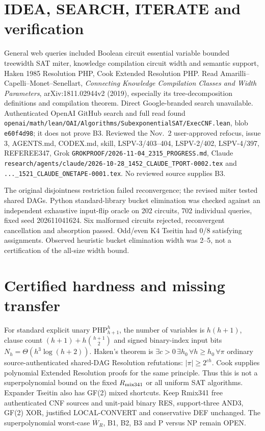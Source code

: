 \documentclass[11pt]{article}
\begin{document}
\section*{IDEA, SEARCH, ITERATE and verification}
General web queries included Boolean circuit essential variable bounded treewidth SAT miter, knowledge compilation circuit width and semantic support, Haken 1985 Resolution PHP, Cook Extended Resolution PHP. Read Amarilli--Capelli--Monet--Senellart, \emph{Connecting Knowledge Compilation Classes and Width Parameters}, arXiv:1811.02944v2 (2019), especially its tree-decomposition definitions and compilation theorem. Direct Google-branded search unavailable. Authenticated OpenAI GitHub search and full read found \texttt{openai/math/lean/OAI/Algorithms/SubexponentialSAT/ExecCNF.lean}, blob \texttt{e60f4d98}; it does not prove B3. Reviewed the Nov.\ 2 user-approved refocus, issue 3, AGENTS.md, CODEX.md, skill, LSPV-3/403--404, LSPV-2/402, LSPV-4/397, REFEREE347, Grok \texttt{GROKPROOF/2026-11-04\_2315\_PROGRESS.md}, Claude \texttt{research/agents/claude/2026-10-28\_1452\_CLAUDE\_TPORT-0002.tex} and \texttt{...\_1521\_CLAUDE\_ONETAPE-0001.tex}. No reviewed source supplies B3.

The original disjointness restriction failed reconvergence; the revised miter tested shared DAGs. Python standard-library bucket elimination was checked against an independent exhaustive input-flip oracle on 202 circuits, 702 individual queries, fixed seed 202611041624. Six malformed circuits rejected, reconvergent cancellation and absorption passed. Odd/even K4 Tseitin had 0/8 satisfying assignments. Observed heuristic bucket elimination width was 2--5, not a certification of the all-size width bound.

\section*{Certified hardness and missing transfer}
For standard explicit unary $\mathrm{PHP}_{h+1}^{h}$, the number of variables is $h(h+1)$, clause count $(h+1)+h\binom{h+1}{2}$ and signed binary-index input bits $N_h=\Theta(h^3\log(h+2))$. Haken's theorem is $\exists c>0\,\exists h_0\,\forall h\ge h_0\,\forall\pi$ ordinary source-authenticated shared-DAG Resolution refutations: $|\pi|\ge2^{ch}$. Cook supplies polynomial Extended Resolution proofs for the same principle. Thus this is not a superpolynomial bound on the fixed $R_{\rm mix341}$ or all uniform SAT algorithms. Expander Tseitin also has GF(2) mixed shortcuts. Keep Rmix341 free authenticated CNF sources and unit-paid binary RES, support-three AND3, GF(2) XOR, justified LOCAL-CONVERT and conservative DEF unchanged. The superpolynomial worst-case $\overline W_R$, B1, B2, B3 and P versus NP remain OPEN.
\end{document}
